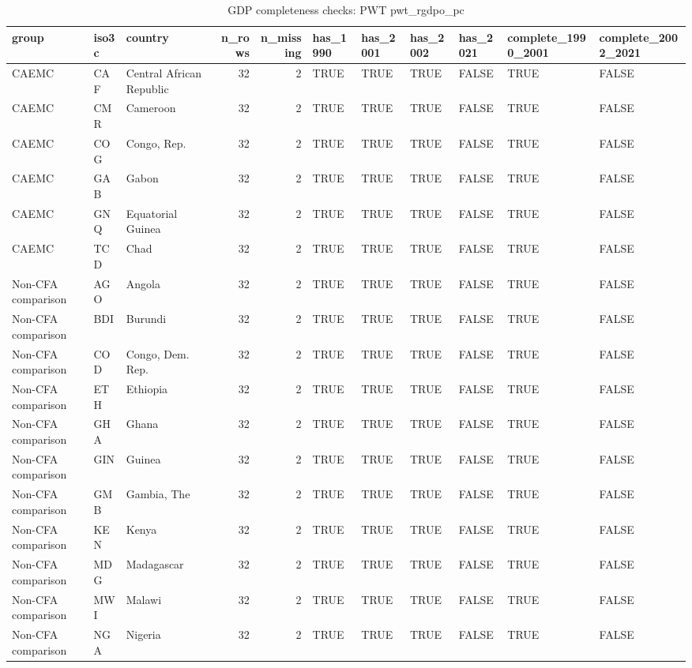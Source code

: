 \begin{table}

\caption{GDP completeness checks: PWT pwt_rgdpo_pc}
\centering
\begin{tabular}[t]{lllrrllllll}
\toprule
group & iso3c & country & n\_rows & n\_missing & has\_1990 & has\_2001 & has\_2002 & has\_2021 & complete\_1990\_2001 & complete\_2002\_2021\\
\midrule
CAEMC & CAF & Central African Republic & 32 & 2 & TRUE & TRUE & TRUE & FALSE & TRUE & FALSE\\
CAEMC & CMR & Cameroon & 32 & 2 & TRUE & TRUE & TRUE & FALSE & TRUE & FALSE\\
CAEMC & COG & Congo, Rep. & 32 & 2 & TRUE & TRUE & TRUE & FALSE & TRUE & FALSE\\
CAEMC & GAB & Gabon & 32 & 2 & TRUE & TRUE & TRUE & FALSE & TRUE & FALSE\\
CAEMC & GNQ & Equatorial Guinea & 32 & 2 & TRUE & TRUE & TRUE & FALSE & TRUE & FALSE\\
\addlinespace
CAEMC & TCD & Chad & 32 & 2 & TRUE & TRUE & TRUE & FALSE & TRUE & FALSE\\
Non-CFA comparison & AGO & Angola & 32 & 2 & TRUE & TRUE & TRUE & FALSE & TRUE & FALSE\\
Non-CFA comparison & BDI & Burundi & 32 & 2 & TRUE & TRUE & TRUE & FALSE & TRUE & FALSE\\
Non-CFA comparison & COD & Congo, Dem. Rep. & 32 & 2 & TRUE & TRUE & TRUE & FALSE & TRUE & FALSE\\
Non-CFA comparison & ETH & Ethiopia & 32 & 2 & TRUE & TRUE & TRUE & FALSE & TRUE & FALSE\\
\addlinespace
Non-CFA comparison & GHA & Ghana & 32 & 2 & TRUE & TRUE & TRUE & FALSE & TRUE & FALSE\\
Non-CFA comparison & GIN & Guinea & 32 & 2 & TRUE & TRUE & TRUE & FALSE & TRUE & FALSE\\
Non-CFA comparison & GMB & Gambia, The & 32 & 2 & TRUE & TRUE & TRUE & FALSE & TRUE & FALSE\\
Non-CFA comparison & KEN & Kenya & 32 & 2 & TRUE & TRUE & TRUE & FALSE & TRUE & FALSE\\
Non-CFA comparison & MDG & Madagascar & 32 & 2 & TRUE & TRUE & TRUE & FALSE & TRUE & FALSE\\
\addlinespace
Non-CFA comparison & MWI & Malawi & 32 & 2 & TRUE & TRUE & TRUE & FALSE & TRUE & FALSE\\
Non-CFA comparison & NGA & Nigeria & 32 & 2 & TRUE & TRUE & TRUE & FALSE & TRUE & FALSE\\

\end{tabular}
\end{table}
